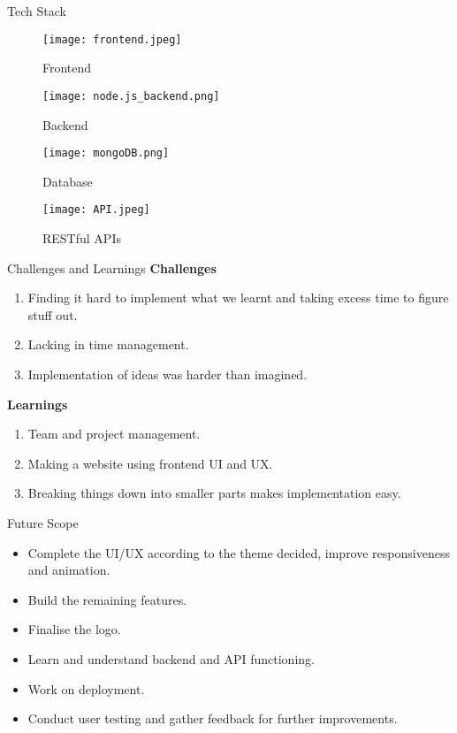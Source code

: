 \documentclass{beamer}
\begin{document}
\begin{frame}{Tech Stack}
    \begin{figure}
        \begin{minipage}[t]{0.2\textwidth}
            \centering
            \texttt{[image: frontend.jpeg]}
            \caption{Frontend}
        \end{minipage}\hfill
        \begin{minipage}[t]{0.2\textwidth}
            \centering
            \texttt{[image: node.js\_backend.png]}
            \caption{Backend}
        \end{minipage}\hfill
        \begin{minipage}[t]{0.2\textwidth}
            \centering
            \texttt{[image: mongoDB.png]}
            \caption{Database}
        \end{minipage}\hfill
        \begin{minipage}[t]{0.2\textwidth}
            \centering
            \texttt{[image: API.jpeg]}
            \caption{RESTful APIs}
        \end{minipage}\hfill
    \end{figure}
\end{frame}

\begin{frame}{Challenges and Learnings}
    \textbf{Challenges}
    \begin{enumerate}
        \item Finding it hard to implement what we learnt and taking excess time to figure stuff out.
        \item Lacking in time management.
        \item Implementation of ideas was harder than imagined.
    \end{enumerate}
    \textbf{Learnings}
    \begin{enumerate}
        \item Team and project management.
        \item Making a website using frontend UI and UX.
        \item Breaking things down into smaller parts makes implementation easy.
    \end{enumerate}
\end{frame}

\begin{frame}{Future Scope}
    \begin{itemize}
        \item Complete the UI/UX according to the theme decided, improve responsiveness and animation.
        \item Build the remaining features.
        \item Finalise the logo.
        \item Learn and understand backend and API functioning.
        \item Work on deployment.
        \item Conduct user testing and gather feedback for further improvements.
    \end{itemize}
\end{frame}
\end{document}
